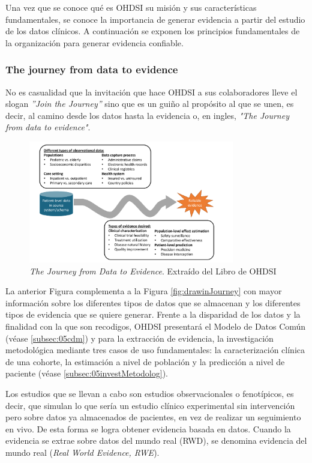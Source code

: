 Una vez que se conoce qué es OHDSI su misión y sus características fundamentales, se conoce la importancia de generar evidencia a partir del estudio de los datos clínicos. A continuación se exponen los principios fundamentales de la organización para generar evidencia confiable.

\subsubsection{The journey from data to evidence}

No es casualidad que la invitación que hace OHDSI a sus colaboradores lleve el slogan \textit{''Join the Journey''} sino que es un guiño al propósito al que se unen, es decir, al camino desde los datos hasta la evidencia o, en ingles, \textit{"The Journey from data to evidence"}.

\begin{figure}[H]
    \centering
    \includegraphics[width=0.80\textwidth]{figures/journeyDataToEvidence.png}
     \caption{\textit{The Journey from Data to Evidence}. Extraído del Libro de OHDSI \cite{OHDSIbook}}
    \label{fig:journeyDataToEvidence}
\end{figure}

La anterior Figura complementa a la Figura \ref{fig:drawinJourney} con mayor información sobre los diferentes tipos de datos que se almacenan y los diferentes tipos de evidencia que se quiere generar. Frente a la disparidad de los datos y la finalidad con la que son recodigos, OHDSI presentará el Modelo de Datos Común (véase \ref{subsec:05cdm}) y para la extracción de evidencia, la investigación metodológica mediante tres casos de uso fundamentales: la caracterización clínica de una cohorte, la estimación a nivel de población y la predicción a nivel de paciente (véase \ref{subsec:05investMetodolog}).

Los estudios que se llevan a cabo son estudios observacionales o fenotípicos, es decir, que simulan lo que sería un estudio clínico experimental sin intervención pero sobre datos ya almacenados de pacientes, en vez de realizar un seguimiento en vivo. De esta forma se logra obtener evidencia basada en datos. Cuando la evidencia se extrae sobre datos del mundo real (RWD), se denomina evidencia del mundo real (\textit{Real World Evidence, RWE}).

